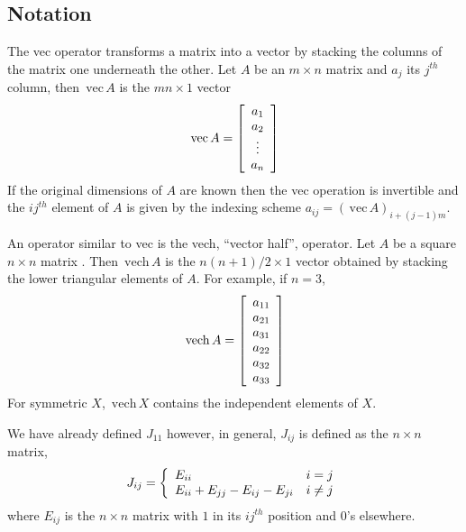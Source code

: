 \documentclass[12pt]{article}
\begin{document}
\subsection{Notation}

The vec operator transforms a matrix into a vector by stacking the columns of
the matrix one underneath the other. Let $A$ be an $m\times n$ matrix and
$a_{j}$ its $j^{th}$ column, then $\,\mathrm{vec}\,A$ is the $mn\times1$
vector
\begin{equation}
\,\mathrm{vec}\,A=\left[
\begin{array}
[c]{c}%
a_{1}\\
a_{2}\\
\vdots\\
a_{n}%
\end{array}
\right]
\end{equation}
If the original dimensions of $A$ are known then the vec operation is
invertible and the $ij^{th}$ element of $A$ is given by the indexing scheme
$a_{ij}=\left(  \,\mathrm{vec}\,A\right)  _{i+\left(  j-1\right)  m}$.

An operator similar to vec is the vech, ``vector half'', operator. Let $A$ be
a square $n\times n$ matrix . Then $\,\mathrm{vech}\,A$ is the $n\left(
n+1\right)  /2\times1$ vector obtained by stacking the lower triangular
elements of $A$. For example, if $n=3$,
\begin{equation}
\,\mathrm{vech}\,A=\left[
\begin{array}
[c]{c}%
a_{11}\\
a_{21}\\
a_{31}\\
a_{22}\\
a_{32}\\
a_{33}%
\end{array}
\right]
\end{equation}
For symmetric $X$, $\,\mathrm{vech}\,X$ contains the independent elements of
$X$.

We have already defined $J_{11}$ however, in general, $J_{ij}$ is defined as
the $n\times n$ matrix,
\begin{equation}
J_{ij}=\left\{
\begin{array}
[c]{ll}%
E_{ii} & i=j\\
E_{ii}+E_{jj}-E_{ij}-E_{ji} & i\neq j
\end{array}
\right. \label{Jij}%
\end{equation}
where $E_{ij}$ is the $n\times n$ matrix with $1$ in its $ij^{th}$ position
and $0$'s elsewhere.
\end{document}
